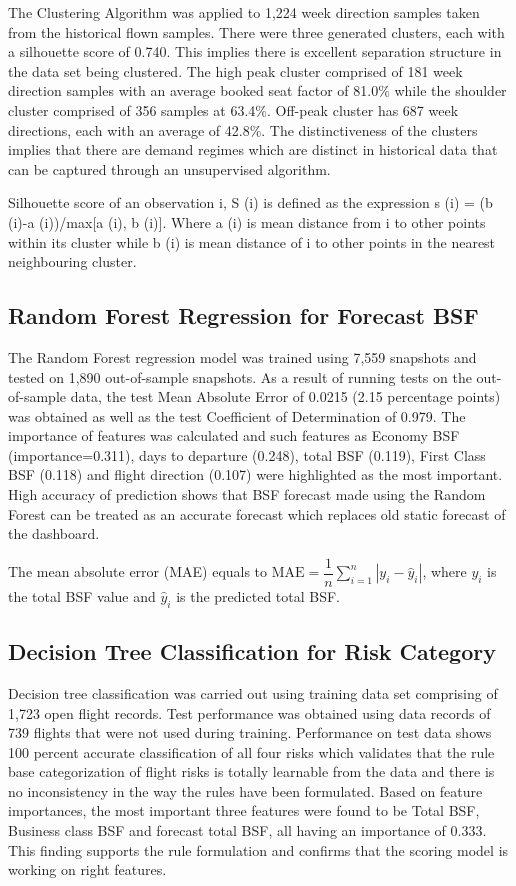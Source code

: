The Clustering Algorithm was applied to 1,224 week direction samples taken from the historical flown samples. There were three generated clusters, each with a silhouette score of 0.740. This implies there is excellent separation structure in the data set being clustered. The high peak cluster comprised of 181 week direction samples with an average booked seat factor of 81.0\% while the shoulder cluster comprised of 356 samples at 63.4\%. Off-peak cluster has 687 week directions, each with an average of 42.8\%. The distinctiveness of the clusters implies that there are demand regimes which are distinct in historical data that can be captured through an unsupervised algorithm.

Silhouette score of an observation i, S (i) is defined as the expression s (i) = (b (i)-a (i))/max[a (i), b (i)]. Where a (i) is mean distance from i to other points within its cluster while b (i) is mean distance of i to other points in the nearest neighbouring cluster.

\subsection{Random Forest Regression for Forecast BSF}

The Random Forest regression model was trained using 7,559 snapshots and tested on 1,890 out-of-sample snapshots. As a result of running tests on the out-of-sample data, the test Mean Absolute Error of 0.0215 (2.15 percentage points) was obtained as well as the test Coefficient of Determination of 0.979. The importance of features was calculated and such features as Economy BSF (importance=0.311), days to departure (0.248), total BSF (0.119), First Class BSF (0.118) and flight direction (0.107) were highlighted as the most important. High accuracy of prediction shows that BSF forecast made using the Random Forest can be treated as an accurate forecast which replaces old static forecast of the dashboard.

The mean absolute error (MAE) equals to $\mathrm{MAE} = \dfrac{1}{n} \sum_{i=1}^{n} \left| y_i - \hat{y}_i \right|$, where $y_i$ is the total BSF value and $\hat{y}_i$ is the predicted total BSF.

\subsection{Decision Tree Classification for Risk Category}

Decision tree classification was carried out using training data set comprising of 1,723 open flight records. Test performance was obtained using data records of 739 flights that were not used during training. Performance on test data shows 100 percent accurate classification of all four risks which validates that the rule base categorization of flight risks is totally learnable from the data and there is no inconsistency in the way the rules have been formulated. Based on feature importances, the most important three features were found to be Total BSF, Business class BSF and forecast total BSF, all having an importance of 0.333. This finding supports the rule formulation and confirms that the scoring model is working on right features.

